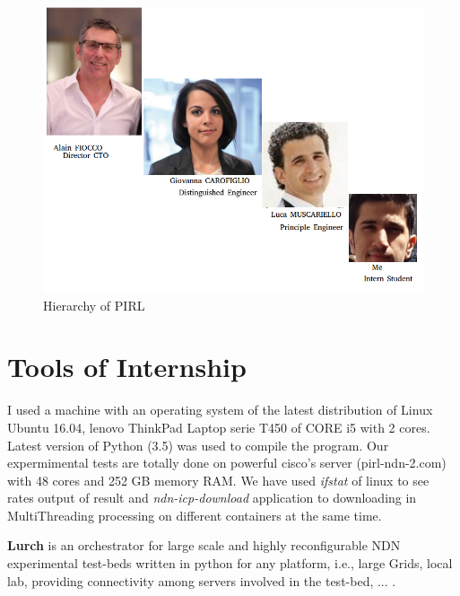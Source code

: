 \begin{figure}

\begin{center}

\includegraphics[scale = 0.3]{Pictures/photos.png}

\caption{Hierarchy of PIRL} \label{photos} 

\end{center}

\end{figure}




\section{Tools of Internship}

I used a machine with an operating system of the latest distribution of Linux Ubuntu 16.04, lenovo ThinkPad Laptop serie T450 of CORE i5 with 2 cores. Latest version of Python (3.5) was used to compile the program.  Our expermimental tests are totally done on powerful cisco's server (pirl-ndn-2.com) with 48 cores and 252 GB memory RAM. We have used \textit{ifstat} of linux to see rates output of result and \textit{ndn-icp-download} application to downloading in MultiThreading processing on different containers at the same time.

\textbf{\huge{Lurch}} is an orchestrator for large scale and highly reconfigurable NDN experimental test-beds written in python for any platform, i.e., large Grids, local lab, providing connectivity among servers involved in the test-bed, ... .

